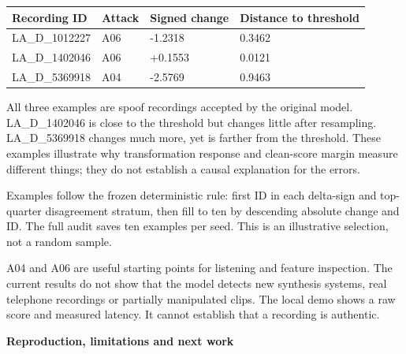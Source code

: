 \documentclass[10pt,a4paper]{article}
\newcommand{\reporttitle}[1]{{\color{navy}\Large\bfseries #1}\par\vspace{5pt}}
\begin{document}
\par

\begin{center}\small

\begin{tabular}{@{}llll@{}}\toprule

Recording ID & Attack & Signed change & Distance to threshold \\

\midrule

LA\_D\_1012227 & A06 & -1.2318 & 0.3462 \\

LA\_D\_1402046 & A06 & +0.1553 & 0.0121 \\

LA\_D\_5369918 & A04 & -2.5769 & 0.9463 \\

\bottomrule\end{tabular}\end{center}

All three examples are spoof recordings accepted by the original model. LA\_D\_1402046 is close to the threshold but changes little after resampling. LA\_D\_5369918 changes much more, yet is farther from the threshold. These examples illustrate why transformation response and clean-score margin measure different things; they do not establish a causal explanation for the errors.\par

Examples follow the frozen deterministic rule: first ID in each delta-sign and top-quarter disagreement stratum, then fill to ten by descending absolute change and ID. The full audit saves ten examples per seed. This is an illustrative selection, not a random sample.\par

\par

A04 and A06 are useful starting points for listening and feature inspection. The current results do not show that the model detects new synthesis systems, real telephone recordings or partially manipulated clips. The local demo shows a raw score and measured latency. It cannot establish that a recording is authentic.\par

\clearpage

\reporttitle{Reproduction, limitations and next work}
\end{document}
